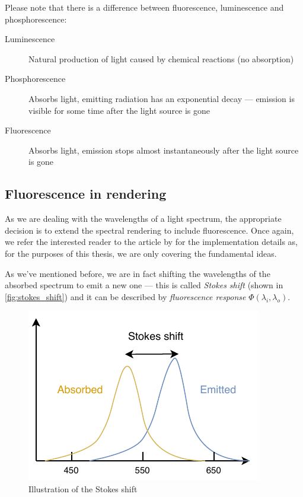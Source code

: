 Please note that there is a difference between fluorescence, luminescence and phosphorescence:

\begin{description}
	\item[Luminescence] Natural production of light caused by chemical reactions (no absorption)
	\item[Phosphorescence] Absorbs light, emitting radiation has an exponential decay --- emission is visible for some time after the light source is gone
	\item[Fluorescence] Absorbs light, emission stops almost instantaneously after the light source is gone
\end{description}

\subsection{Fluorescence in rendering}
As we are dealing with the wavelengths of a light spectrum, the appropriate decision is to extend the spectral rendering to include fluorescence. Once again, we refer the interested reader to the article by \citet{mojzik2018handling} for the implementation details as, for the purposes of this thesis,  we are only covering the fundamental ideas.

As we've mentioned before, we are in fact shifting the wavelengths of the absorbed spectrum to emit a new one --- this is called \emph{Stokes shift} (shown in \autoref{fig:stokes_shift}) and it can be described by \emph{fluorescence response} $\Phi(\lambda_i,\lambda_o)$.

\begin{figure}
	\centering
	\includegraphics[width=0.7\linewidth]{img/stokes_shift.pdf}
	\caption{Illustration of the Stokes shift}
	\label{fig:stokes_shift}
\end{figure}

